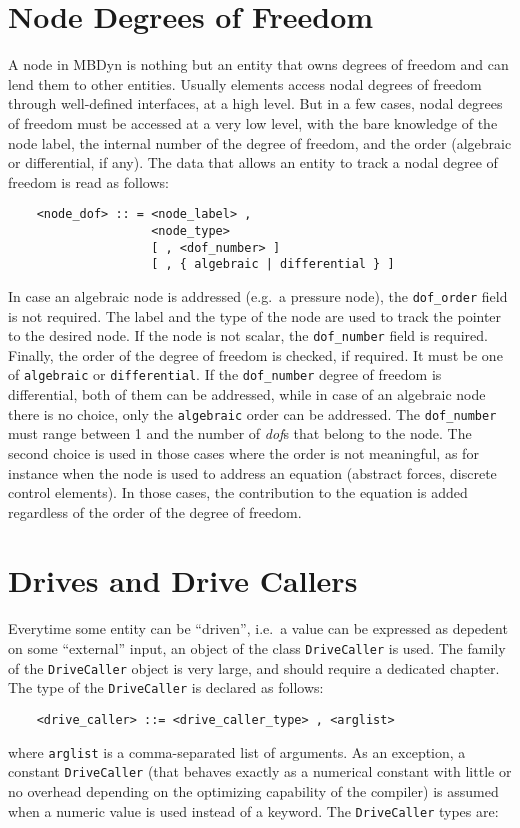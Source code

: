 \section{Node Degrees of Freedom}\label{sec:node_dof}
A node in MBDyn is nothing but an entity that owns degrees of freedom and
can lend them to other entities. 
Usually elements access nodal degrees of freedom through well-defined
interfaces, at a high level. 
But in a few cases, nodal degrees of freedom must be accessed
at a very low level, with the bare knowledge of the node label,
the internal number of the degree of freedom, and the order 
(algebraic or differential, if any).
The data that allows an entity to track a nodal degree of freedom is read as
follows:
\begin{verbatim}
    <node_dof> :: = <node_label> , 
                    <node_type> 
                    [ , <dof_number> ]
                    [ , { algebraic | differential } ]
\end{verbatim}
In case an algebraic node is addressed (e.g.\ a pressure node), 
the \texttt{dof\_order} field is not required.
The label and the type of the node are used to track the pointer to the
desired node. 
If the node is not scalar, the \texttt{dof\_number} field is required.
Finally, the order of the degree of freedom is checked, if required.
It must be one of \texttt{algebraic} or \texttt{differential}.
If the \texttt{dof\_number} degree of freedom is differential, both
of them can be addressed, while in case of an algebraic node there is no
choice, only the \texttt{algebraic} order can be addressed.
The \texttt{dof\_number} must range between 1 and the number of {\em dof}s that
belong to the node.
The second choice is used in those cases where the order is not meaningful,
as for instance when the node is used to address an equation (abstract
forces, discrete control elements). 
In those cases, the contribution to the equation is added regardless 
of the order of the degree of freedom.

\section{Drives and Drive Callers}\label{sec:DRIVES}
Everytime some entity can be ``driven'', i.e.\ a value can be
expressed as depedent on some ``external'' input, an object of the class 
\texttt{DriveCaller} is used. 
The family of the \texttt{DriveCaller} object is very large, 
and should require a dedicated chapter.
The type of the \texttt{DriveCaller} is declared as follows:
\begin{verbatim}
    <drive_caller> ::= <drive_caller_type> , <arglist>
\end{verbatim}    
where \texttt{arglist} is a comma-separated list of arguments.
As an exception, a constant \texttt{DriveCaller} (that behaves exactly as a
numerical constant with little or no overhead depending on the optimizing
capability of the compiler) is assumed when a numeric value is used instead
of a keyword.
The \texttt{DriveCaller} types are:

